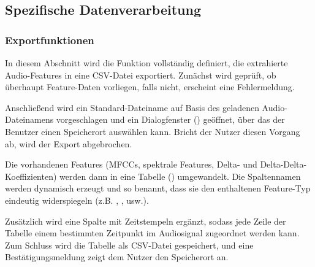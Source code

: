 \subsection{Spezifische Datenverarbeitung}

\subsubsection{Exportfunktionen}

In diesem Abschnitt wird die Funktion  vollständig definiert, die extrahierte Audio-Features in eine CSV-Datei exportiert. Zunächst wird geprüft, ob überhaupt Feature-Daten vorliegen, falls nicht, erscheint eine Fehlermeldung. 

Anschließend wird ein Standard-Dateiname auf Basis des geladenen Audio-Dateinamens vorgeschlagen und ein Dialogfenster () geöffnet, über das der Benutzer einen Speicherort auswählen kann. Bricht der Nutzer diesen Vorgang ab, wird der Export abgebrochen. 

Die vorhandenen Features (MFCCs, spektrale Features, Delta- und Delta-Delta-Koeffizienten) werden dann in eine Tabelle () umgewandelt. Die Spaltennamen werden dynamisch erzeugt und so benannt, dass sie den enthaltenen Feature-Typ eindeutig widerspiegeln (z.B. , ,  usw.). 

Zusätzlich wird eine Spalte mit Zeitstempeln ergänzt, sodass jede Zeile der Tabelle einem bestimmten Zeitpunkt im Audiosignal zugeordnet werden kann. Zum Schluss wird die Tabelle als CSV-Datei gespeichert, und eine Bestätigungsmeldung zeigt dem Nutzer den Speicherort an. \cite{Hossain:2025} \cite{MathWorks:2025BigDataVideo} \cite{Pfister:2017} \cite{MathWorks:2025SignalToolbox}


